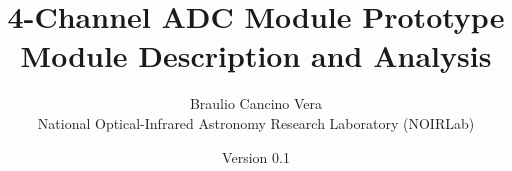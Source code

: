 \documentclass[11pt,letterpaper]{article}
\begin{document}
\title{4-Channel ADC Module Prototype\\Module Description and Analysis}
\author{Braulio Cancino Vera \\ National Optical-Infrared Astronomy Research Laboratory (NOIRLab)}
\date{Version 0.1}
\maketitle

\tableofcontents
\clearpage


\newpage
\newpage
\newpage
\newpage
\newpage
\newpage

% 
% 
\end{document}
